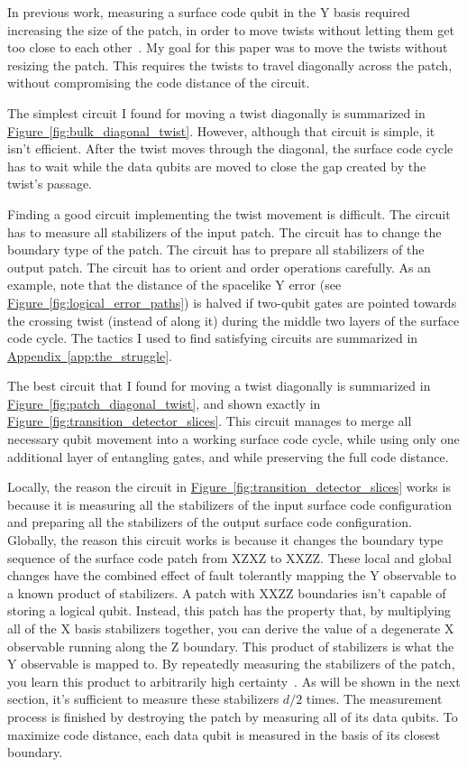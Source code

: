 \documentclass[onecolumn,unpublished,a4paper]{quantumarticle}
\theoremstyle{definition}
\theoremstyle{definition}
\theoremstyle{definition}
\DeclareRobustCommand{\app}[1]{\hyperref[app:#1]{Appendix~\ref*{app:#1}}}
\newcommand{\fig}[1]{\hyperref[fig:#1]{Figure~\ref*{fig:#1}}}
\begin{document}
In previous work, measuring a surface code qubit in the Y basis required increasing the size of the patch, in order to move twists without letting them get too close to each other~\cite{brown2017surfacetwists,bombin2021logical,chamberland2022universal}.
My goal for this paper was to move the twists without resizing the patch.
This requires the twists to travel diagonally across the patch, without compromising the code distance of the circuit.

The simplest circuit I found for moving a twist diagonally is summarized in \fig{bulk_diagonal_twist}.
However, although that circuit is simple, it isn't efficient.
After the twist moves through the diagonal, the surface code cycle has to wait while the data qubits are moved to close the gap created by the twist's passage.

Finding a good circuit implementing the twist movement is difficult.
The circuit has to measure all stabilizers of the input patch.
The circuit has to change the boundary type of the patch.
The circuit has to prepare all stabilizers of the output patch.
The circuit has to orient and order operations carefully.
As an example, note that the distance of the spacelike Y error (see \fig{logical_error_paths}) is halved if two-qubit gates are pointed towards the crossing twist (instead of along it) during the middle two layers of the surface code cycle.
The tactics I used to find satisfying circuits are summarized in \app{the_struggle}.

The best circuit that I found for moving a twist diagonally is summarized in \fig{patch_diagonal_twist}, and shown exactly in \fig{transition_detector_slices}.
This circuit manages to merge all necessary qubit movement into a working surface code cycle, while using only one additional layer of entangling gates, and while preserving the full code distance.

Locally, the reason the circuit in \fig{transition_detector_slices} works is because it is measuring all the stabilizers of the input surface code configuration and preparing all the stabilizers of the output surface code configuration.
Globally, the reason this circuit works is because it changes the boundary type sequence of the surface code patch from XZXZ to XXZZ.
These local and global changes have the combined effect of fault tolerantly mapping the Y observable to a known product of stabilizers.
A patch with XXZZ boundaries isn't capable of storing a logical qubit.
Instead, this patch has the property that, by multiplying all of the X basis stabilizers together, you can derive the value of a degenerate X observable running along the Z boundary.
This product of stabilizers is what the Y observable is mapped to.
By repeatedly measuring the stabilizers of the patch, you learn this product to arbitrarily high certainty~\cite{gidney2022stability}.
As will be shown in the next section, it's sufficient to measure these stabilizers $d/2$ times.
The measurement process is finished by destroying the patch by measuring all of its data qubits.
To maximize code distance, each data qubit is measured in the basis of its closest boundary.
\end{document}
